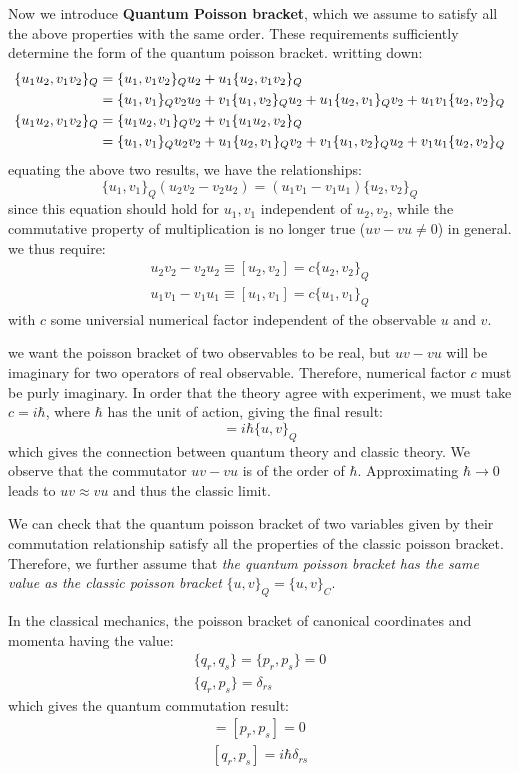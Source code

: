 \documentclass{article}
\begin{document}
Now we introduce \textbf{Quantum Poisson bracket}, which we assume to satisfy all the above properties with the same order. 
These requirements sufficiently determine the form of the quantum poisson bracket. 
writting down:
\begin{align}
    \{u_1u_2,v_1v_2\}_Q &= \{u_1,v_1v_2\}_Qu_2 + u_1\{u_2,v_1v_2\}_Q \notag \\
                      &= \{u_1,v_1\}_Qv_2u_2 + v_1\{u_1,v_2\}_Qu_2 + u_1\{u_2,v_1\}_Qv_2 + u_1v_1\{ u_2,v_2 \}_Q \\
    \{u_1u_2,v_1v_2\}_Q &= \{u_1u_2,v_1\}_Qv_2 + v_1\{u_1u_2,v_2\}_Q \notag \\
                      &= \{u_1,v_1\}_Qu_2v_2 + u_1\{u_2,v_1\}_Qv_2 + v_1\{u_1,v_2\}_Qu_2 + v_1u_1\{ u_2,v_2 \}_Q        
\end{align} 
equating the above two results, we have the relationships:
\begin{equation}
    \{u_1,v_1\}_Q(u_2v_2 - v_2u_2) = (u_1v_1 - v_1u_1)\{u_2,v_2\}_Q
\end{equation}
since this equation should hold for $u_1,v_1$ independent of $u_2,v_2$, while 
the commutative property of multiplication is no longer true ($uv-vu\neq 0$) in general. we thus require:
\begin{align}
    u_2v_2 - v_2u_2 \equiv [u_2, v_2] = c\{u_2,v_2\}_Q \\
    u_1v_1 - v_1u_1 \equiv [u_1, v_1] = c\{u_1,v_1\}_Q
\end{align}
with $c$ some universial numerical factor independent of the observable $u$ and $v$. 

we want the poisson bracket of two observables to be real, but $uv - vu$ will be 
imaginary for two operators of real observable. Therefore, numerical factor $c$ must
be purly imaginary.  In order that the theory agree with experiment, we must take 
$c = i\hbar$, where $\hbar$ has the unit of action, giving the final result:
\begin{equation}
    [u,v] = i\hbar\{u,v\}_Q
\end{equation}
which gives the connection between quantum theory and classic theory.
We observe that the commutator $uv - vu$ is of the order of $\hbar$. Approximating $\hbar \to 0$
leads to $uv \approx vu$ and thus the classic limit.

We can check that the quantum poisson bracket of two variables given by their commutation relationship
satisfy all the properties of the classic poisson bracket. Therefore, we further assume that
\emph{the quantum poisson bracket has the same value as the classic poisson bracket} 
$\{u,v\}_Q = \{u,v\}_C$.

In the classical mechanics, the poisson bracket of canonical coordinates and momenta having the value:
\begin{gather}
    \{q_r,q_s\} = \{p_r,p_s\} = 0\\
    \{q_r,p_s\} = \delta_{rs}
\end{gather}
which gives the quantum commutation result:
\begin{gather}
    [q_r,q_s] = [p_r,p_s] = 0\\
    [q_r,p_s] = i\hbar\delta_{rs}
\end{gather}
\end{document}
